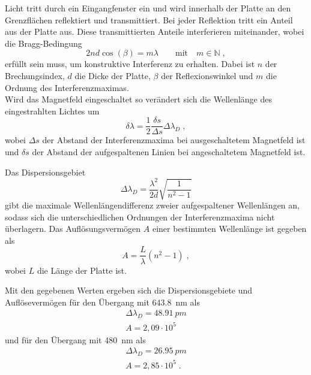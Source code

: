         Licht tritt durch ein Eingangfenster ein und wird innerhalb der Platte an den Grenzflächen reflektiert und transmittiert.
        Bei jeder Reflektion tritt ein Anteil aus der Platte aus.
        Diese transmittierten Anteile interferieren miteinander, wobei die Bragg-Bedingung
        \begin{equation}
            2 n d \cos(\beta) = m \lambda \qquad \text{mit} \quad m \in \mathbb{N} \;,
        \end{equation}
        erfüllt sein muss, um konstruktive Interferenz zu erhalten.
        Dabei ist $n$ der Brechungsindex, $d$ die Dicke der Platte, $\beta$ der Reflexionswinkel und $m$ die Ordnung des Interferenzmaximas.
        \\
        Wird das Magnetfeld eingeschaltet so verändert sich die Wellenlänge des eingestrahlten Lichtes um
        \begin{equation}
            \delta \lambda = \frac{1}{2} \frac{\delta s}{\Delta s} \Delta \lambda_D \;,
        \end{equation}
        wobei $\Delta s$ der Abstand der Interferenzmaxima bei ausgeschaltetem Magnetfeld ist und $\delta s$ der Abstand der aufgespaltenen Linien bei angeschaltetem Magnetfeld ist.

        Das Dispersionsgebiet
        \begin{equation}
            \Delta \lambda_D = \frac{\lambda^2}{2 d} \sqrt{\frac{1}{n^2 - 1}}
        \end{equation}
        gibt die maximale Wellenlängendifferenz zweier aufgespaltener Wellenlängen an, sodass sich die unterschiedlichen Ordnungen der Interferenzmaxima nicht überlagern.
        Das Auflösungsvermögen $A$ einer bestimmten Wellenlänge ist gegeben als
        \begin{equation}
            A = \frac{L}{\lambda} (n^2 - 1) \;,
        \end{equation}
        wobei $L$ die Länge der Platte ist.
        
        Mit den gegebenen Werten ergeben sich die Dispersionsgebiete und Auflösevermögen für den Übergang mit \SI{643,8}{nm} als
        \begin{align*}
            \Delta \lambda_D = \SI{48,91}{pm} \\
            A = 2,09 \cdot 10^5
        \end{align*}
        und für den Übergang mit \SI{480}{nm} als
        \begin{align*}
            \Delta \lambda_D = \SI{26,95}{pm} \\
            A = 2,85 \cdot 10^5 \;.
        \end{align*}
